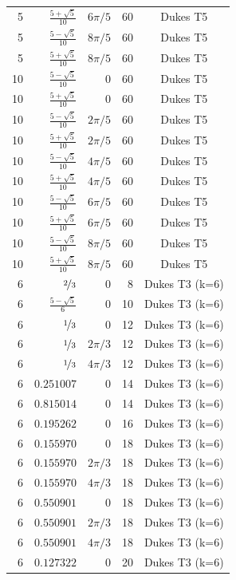 \begin{longtable}{rrrrc}
5 & $\frac{5 + \sqrt{5}}{10}$ & $6\pi/5$ & 60 & Dukes T5 \\
5 & $\frac{5 - \sqrt{5}}{10}$ & $8\pi/5$ & 60 & Dukes T5 \\
5 & $\frac{5 + \sqrt{5}}{10}$ & $8\pi/5$ & 60 & Dukes T5 \\
10 & $\frac{5 - \sqrt{5}}{10}$ & $0$ & 60 & Dukes T5 \\
10 & $\frac{5 + \sqrt{5}}{10}$ & $0$ & 60 & Dukes T5 \\
10 & $\frac{5 - \sqrt{5}}{10}$ & $2\pi/5$ & 60 & Dukes T5 \\
10 & $\frac{5 + \sqrt{5}}{10}$ & $2\pi/5$ & 60 & Dukes T5 \\
10 & $\frac{5 - \sqrt{5}}{10}$ & $4\pi/5$ & 60 & Dukes T5 \\
10 & $\frac{5 + \sqrt{5}}{10}$ & $4\pi/5$ & 60 & Dukes T5 \\
10 & $\frac{5 - \sqrt{5}}{10}$ & $6\pi/5$ & 60 & Dukes T5 \\
10 & $\frac{5 + \sqrt{5}}{10}$ & $6\pi/5$ & 60 & Dukes T5 \\
10 & $\frac{5 - \sqrt{5}}{10}$ & $8\pi/5$ & 60 & Dukes T5 \\
10 & $\frac{5 + \sqrt{5}}{10}$ & $8\pi/5$ & 60 & Dukes T5 \\
6 & $\nicefrac{2}{3}$ & $0$ & 8 & Dukes T3 (k=6) \\
6 & $\frac{5 - \sqrt{5}}{6}$ & $0$ & 10 & Dukes T3 (k=6) \\
6 & $\nicefrac{1}{3}$ & $0$ & 12 & Dukes T3 (k=6) \\
6 & $\nicefrac{1}{3}$ & $2\pi/3$ & 12 & Dukes T3 (k=6) \\
6 & $\nicefrac{1}{3}$ & $4\pi/3$ & 12 & Dukes T3 (k=6) \\
6 & $0.251007$ & $0$ & 14 & Dukes T3 (k=6) \\
6 & $0.815014$ & $0$ & 14 & Dukes T3 (k=6) \\
6 & $0.195262$ & $0$ & 16 & Dukes T3 (k=6) \\
6 & $0.155970$ & $0$ & 18 & Dukes T3 (k=6) \\
6 & $0.155970$ & $2\pi/3$ & 18 & Dukes T3 (k=6) \\
6 & $0.155970$ & $4\pi/3$ & 18 & Dukes T3 (k=6) \\
6 & $0.550901$ & $0$ & 18 & Dukes T3 (k=6) \\
6 & $0.550901$ & $2\pi/3$ & 18 & Dukes T3 (k=6) \\
6 & $0.550901$ & $4\pi/3$ & 18 & Dukes T3 (k=6) \\
6 & $0.127322$ & $0$ & 20 & Dukes T3 (k=6) \\

\end{longtable}
